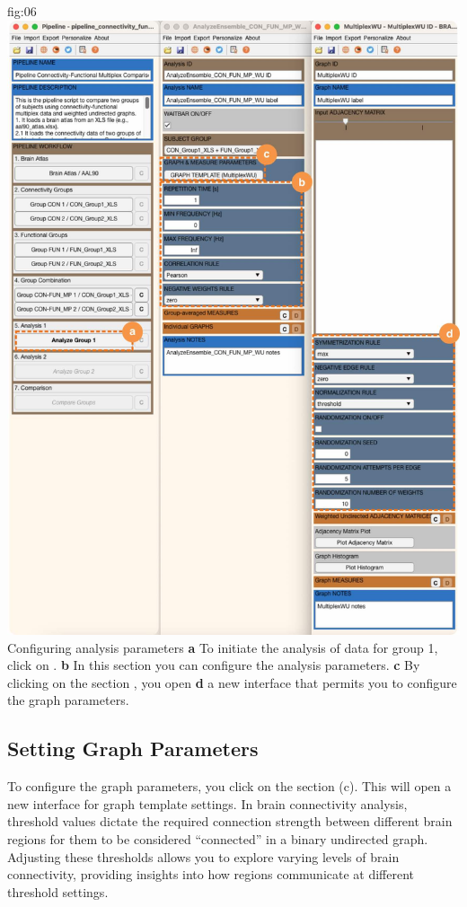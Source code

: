\documentclass[justified]{tufte-handout}
\begin{document}
	{fig:06}
	{\includegraphics{fig06.jpg}}
	{Configuring analysis parameters}
	{
	{\bf a} To initiate the analysis of data for group 1, click on .
 	{\bf b} In this section you can configure the analysis parameters.
 	{\bf c} By clicking on the section , you open {\bf d} a new interface that permits you to configure the graph parameters.
	}

 
\subsection{Setting Graph Parameters}

To configure the graph parameters, you click on the section  (c). This will open a new interface for graph template settings. 
In brain connectivity analysis, threshold values dictate the required connection strength between different brain regions for them to be considered “connected” in a binary undirected graph. 
Adjusting these thresholds allows you to explore varying levels of brain connectivity, providing insights into how regions communicate at different threshold settings.
\end{document}
